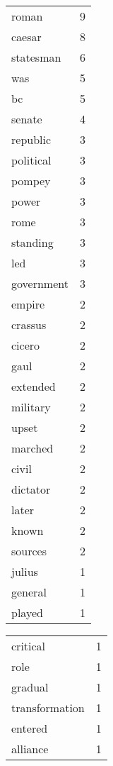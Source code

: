 \begin{center}
\begin{scriptsize}
\begin{tabular}{|ll|}
\hline
roman         & 9\\
caesar        & 8\\
statesman     & 6\\
was           & 5\\
bc            & 5\\
senate        & 4\\
republic      & 3\\
political     & 3\\
pompey        & 3\\
power         & 3\\
rome          & 3\\%
standing      & 3\\%
led           & 3\\%
government    & 3\\%
empire        & 2\\%
crassus       & 2\\%
cicero        & 2\\%
gaul          & 2\\%
extended      & 2\\%
military      & 2\\%
upset         & 2\\%
marched       & 2\\%
civil         & 2\\%
dictator      & 2\\%
later         & 2\\%
known         & 2\\%
sources       & 2\\%
julius        & 1\\%
general       & 1\\%
played        & 1\\%
\hline
\end{tabular}
\begin{tabular}{|ll|}
\hline
critical      & 1\\%
role          & 1\\%
gradual       & 1\\%
transformation& 1\\%
entered       & 1\\%
alliance      & 1\\%

\end{tabular}
\end{scriptsize}
\end{center}
